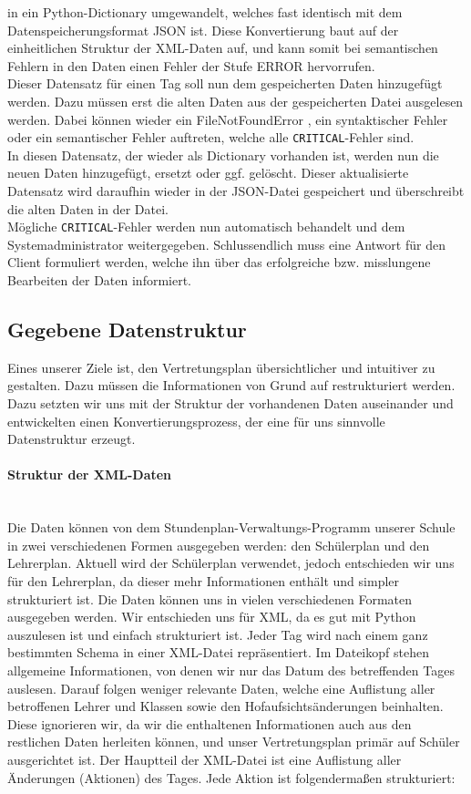 in ein Python-Dictionary umgewandelt, welches fast identisch mit dem Datenspeicherungsformat JSON ist.
Diese Konvertierung baut auf der einheitlichen Struktur der XML-Daten auf, und kann somit bei semantischen
Fehlern in den Daten einen Fehler der Stufe ERROR hervorrufen.\\
Dieser Datensatz für einen Tag soll nun dem gespeicherten Daten hinzugefügt werden. Dazu müssen erst
die alten Daten aus der gespeicherten Datei ausgelesen werden. Dabei können wieder ein FileNotFoundError
, ein syntaktischer Fehler oder ein semantischer Fehler auftreten, welche alle \texttt{CRITICAL}-Fehler sind. \\
In diesen Datensatz, der wieder als Dictionary vorhanden ist, werden nun die neuen Daten hinzugefügt, ersetzt
oder ggf. gelöscht. Dieser aktualisierte Datensatz wird daraufhin wieder in der JSON-Datei gespeichert und überschreibt
die alten Daten in der Datei.\\
Mögliche \texttt{CRITICAL}-Fehler werden nun automatisch behandelt und dem Systemadministrator weitergegeben.
Schlussendlich muss eine Antwort für den Client formuliert werden, welche ihn über das erfolgreiche bzw. misslungene
Bearbeiten der Daten informiert.


\subsection{Gegebene Datenstruktur}

Eines unserer Ziele ist, den Vertretungsplan übersichtlicher und intuitiver zu gestalten. Dazu müssen
die Informationen von Grund auf restrukturiert werden. Dazu setzten wir uns mit der Struktur der vorhandenen
Daten auseinander und entwickelten einen Konvertierungsprozess, der eine für uns sinnvolle Datenstruktur
erzeugt.\\
\paragraph{Struktur der XML-Daten}\mbox{}\\ %
Die Daten können von dem Stundenplan-Verwaltungs-Programm unserer Schule in zwei verschiedenen Formen ausgegeben
werden: den Schülerplan und den Lehrerplan. Aktuell wird der Schülerplan verwendet, jedoch entschieden wir
uns für den Lehrerplan, da dieser mehr Informationen enthält und simpler strukturiert ist. Die Daten können
uns in vielen verschiedenen Formaten ausgegeben werden. Wir entschieden uns für XML, da es gut mit Python 
auszulesen ist und einfach strukturiert ist. Jeder Tag wird nach einem ganz bestimmten Schema in einer XML-Datei
repräsentiert. Im Dateikopf stehen allgemeine Informationen, von denen wir nur das Datum des betreffenden Tages
auslesen. Darauf folgen weniger relevante Daten, welche eine Auflistung aller betroffenen Lehrer und Klassen
sowie den Hofaufsichtsänderungen beinhalten. Diese ignorieren wir, da wir die enthaltenen Informationen auch
aus den restlichen Daten herleiten können, und unser Vertretungsplan primär auf Schüler ausgerichtet ist.
Der Hauptteil der XML-Datei ist eine Auflistung aller Änderungen (Aktionen) des Tages. Jede Aktion ist folgendermaßen
strukturiert:

